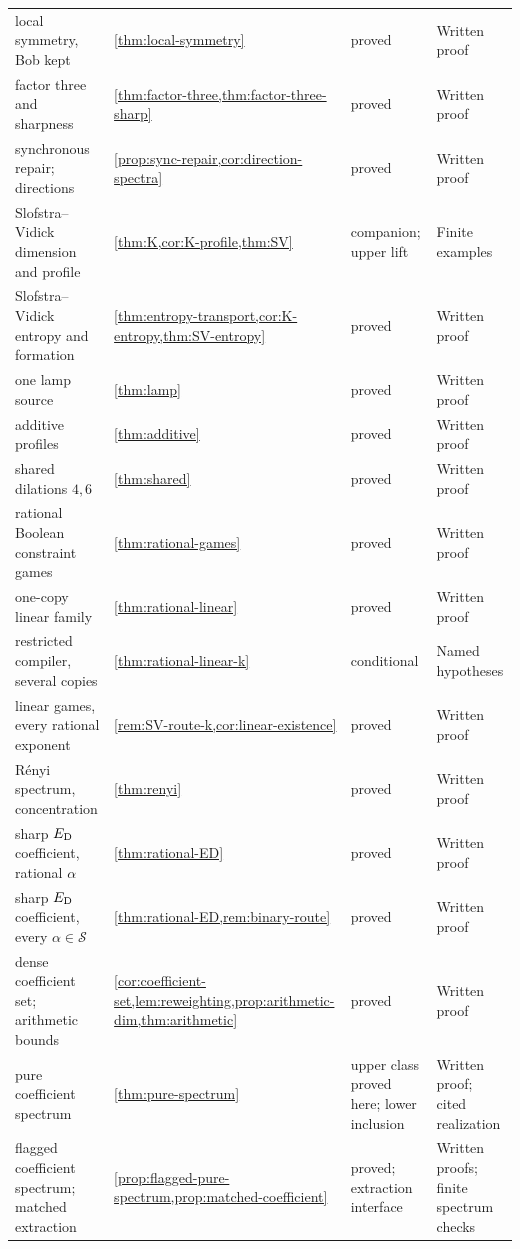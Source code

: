 \begin{longtable}{@{}L{0.3\textwidth}L{0.2\textwidth}L{0.18\textwidth}L{0.22\textwidth}@{}}
local symmetry, Bob kept & \cref{thm:local-symmetry} & proved & Written proof\\
factor three and sharpness & \cref{thm:factor-three,thm:factor-three-sharp} & proved & Written proof\\
synchronous repair; directions & \cref{prop:sync-repair,cor:direction-spectra} & proved & Written proof\\
Slofstra--Vidick dimension and profile & \cref{thm:K,cor:K-profile,thm:SV} & companion; upper lift~\cite[Lemma~11.13]{DM-game} & Finite examples\\
Slofstra--Vidick entropy and formation & \cref{thm:entropy-transport,cor:K-entropy,thm:SV-entropy} & proved & Written proof\\
one lamp source & \cref{thm:lamp} & proved & Written proof\\
additive profiles & \cref{thm:additive} & proved & Written proof\\
shared dilations $4,6$ & \cref{thm:shared} & proved & Written proof\\
rational Boolean constraint games & \cref{thm:rational-games} & proved & Written proof\\
one-copy linear family & \cref{thm:rational-linear} & proved & Written proof\\
restricted compiler, several copies & \cref{thm:rational-linear-k} & conditional & Named hypotheses\\
linear games, every rational exponent & \cref{rem:SV-route-k,cor:linear-existence} & proved & Written proof\\
R\'enyi spectrum, concentration & \cref{thm:renyi} & proved & Written proof\\
sharp $E_{\mathrm D}$ coefficient, rational $\alpha$ & \cref{thm:rational-ED} & proved & Written proof\\
sharp $E_{\mathrm D}$ coefficient, every $\alpha\in\mathcal S$ & \cref{thm:rational-ED,rem:binary-route} & proved & Written proof\\
dense coefficient set; arithmetic bounds & \cref{cor:coefficient-set,lem:reweighting,prop:arithmetic-dim,thm:arithmetic} & proved & Written proof\\
pure coefficient spectrum & \cref{thm:pure-spectrum} & upper class proved here; lower inclusion~\cite[Theorem~1.1]{DM-U3} & Written proof; cited realization\\
flagged coefficient spectrum; matched extraction & \cref{prop:flagged-pure-spectrum,prop:matched-coefficient} & proved; extraction interface~\cite[Lemma~12.1]{DM-U3} & Written proofs; finite spectrum checks\\

\end{longtable}

